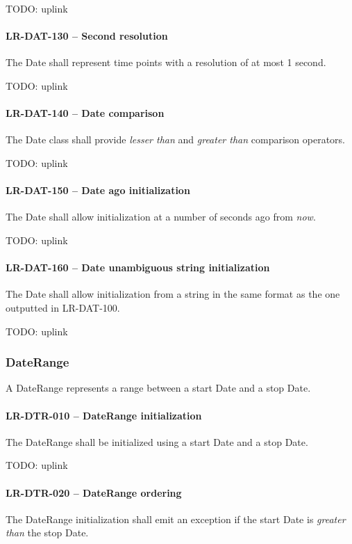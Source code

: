 TODO: uplink
\paragraph{LR-DAT-130 -- Second resolution}
The Date shall represent time points with a resolution of at most 1 second.

TODO: uplink

\paragraph{LR-DAT-140 -- Date comparison}
The Date class shall provide \emph{lesser than} and \emph{greater than}
comparison operators.

TODO: uplink

\paragraph{LR-DAT-150 -- Date ago initialization}
The Date shall allow initialization at a number of seconds ago from
\emph{now}.

TODO: uplink

\paragraph{LR-DAT-160 -- Date unambiguous string initialization}
The Date shall allow initialization from a string in the
same format as the one outputted in LR-DAT-100.

TODO: uplink

\subsubsection{DateRange}
A DateRange represents a range between a start Date and a stop Date.

\paragraph{LR-DTR-010 -- DateRange initialization}
The DateRange shall be initialized using a start Date and a stop Date.

TODO: uplink

\paragraph{LR-DTR-020 -- DateRange ordering}
The DateRange initialization shall emit an exception if the
start Date is \emph{greater than} the stop Date.

